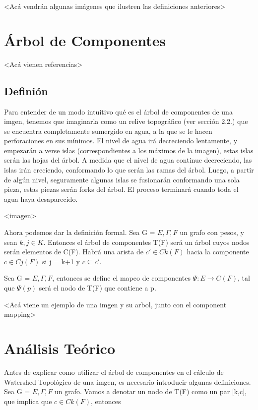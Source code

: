 <Acá vendrán algunas imágenes que ilustren las definiciones anteriores>

\section{Árbol de Componentes}

<Acá vienen referencias>

\subsection{Definión}

Para entender de un modo intuitivo qué es el árbol de componentes de una
imgen, tenemos que imaginarla como un relive topográfico (ver sección
2.2.) que se encuentra completamente sumergido en agua, a la que se le hacen
perforaciones en sus mínimos. El nivel de agua irá decreciendo lentamente, y
empezarán a verse islas (correspondientes a los máximos de la imagen), estas
islas serán las hojas del árbol. A medida que el nivel de agua continue
decreciendo, las islas irán creciendo, conformando lo que serán las ramas del
árbol. Luego, a partir de algún nivel, seguramente algunas islas se fusionarán
conformando una sola pieza, estas piezas serán forks del árbol. El proceso
terminará cuando toda el agua haya desaparecido.

<imagen>

Ahora podemos dar la definición formal. Sea G = $E,\Gamma,F$ un grafo con pesos, y sean \(k,j \in K\). Entonces el árbol de componentes T(F) será un árbol cuyos nodos serán elementos de C(F). Habrá una arista de \(c' \in Ck(F)\) hacia la componente \(c \in Cj(F)\) si j = k+1 y \(c \subseteq c'\).

Sea G = \(E,\Gamma,F\), entonces se define el mapeo de componentes  \(\Psi : E  \to C(F) \),  tal que  \( \Psi(p) \) será el nodo de T(F) que contiene a p.

<Acá viene un ejemplo de una imgen y su arbol, junto con el component mapping>

\section{Análisis Teórico}

Antes de explicar como utilizar el árbol de componentes en el cálculo de Watershed Topológico de una imgen, es necesario introducir algunas definiciones. Sea G = \(E,\Gamma,F\) un grafo. Vamos a denotar un nodo de T(F) como un par [k,c], que implica que \(c \in Ck(F)\), entonces

